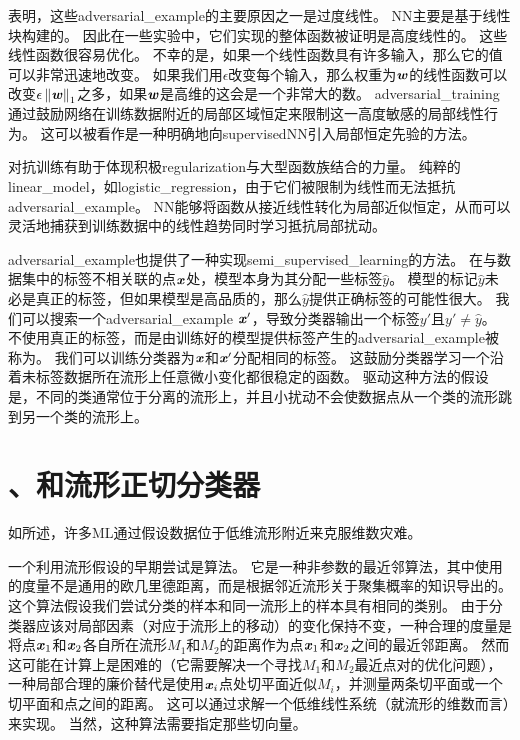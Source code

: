 \cite{Goodfellow-2015-adversarial}表明，这些\gls{adversarial_example}的主要原因之一是过度线性。
\gls{NN}主要是基于线性块构建的。
因此在一些实验中，它们实现的整体函数被证明是高度线性的。
这些线性函数很容易优化。
不幸的是，如果一个线性函数具有许多输入，那么它的值可以非常迅速地改变。
如果我们用$\epsilon$改变每个输入，那么权重为$\boldsymbol{\mathit{w}}$的线性函数可以改变$\epsilon \left\lVert\boldsymbol{\mathit{w}}\right\rVert_1$之多，如果$\boldsymbol{\mathit{w}}$是高维的这会是一个非常大的数。
\gls{adversarial_training}通过鼓励网络在训练数据附近的局部区域恒定来限制这一高度敏感的局部线性行为。
这可以被看作是一种明确地向\gls{supervised}\gls{NN}引入局部恒定先验的方法。

对抗训练有助于体现积极\gls{regularization}与大型函数族结合的力量。
纯粹的\gls{linear_model}，如\gls{logistic_regression}，由于它们被限制为线性而无法抵抗\gls{adversarial_example}。
\gls{NN}能够将函数从接近线性转化为局部近似恒定，从而可以灵活地捕获到训练数据中的线性趋势同时学习抵抗局部扰动。

\gls{adversarial_example}也提供了一种实现\gls{semi_supervised_learning}的方法。
在与数据集中的标签不相关联的点$\boldsymbol{\mathit{x}}$处，模型本身为其分配一些标签$\hat y$。
模型的标记$\hat y$未必是真正的标签，但如果模型是高品质的，那么$\hat y$提供正确标签的可能性很大。
我们可以搜索一个\gls{adversarial_example} $\boldsymbol{\mathit{x}}'$，导致分类器输出一个标签$y'$且$y' \neq \hat y$。
不使用真正的标签，而是由训练好的模型提供标签产生的\gls{adversarial_example}被称为\citep{miyato2015distributional}。
我们可以训练分类器为$\boldsymbol{\mathit{x}}$和$\boldsymbol{\mathit{x}}'$分配相同的标签。
这鼓励分类器学习一个沿着未标签数据所在流形上任意微小变化都很稳定的函数。
驱动这种方法的假设是，不同的类通常位于分离的流形上，并且小扰动不会使数据点从一个类的流形跳到另一个类的流形上。


\section{、和流形正切分类器}
\label{sec:tangent_distance_tangent_prop_and_manifold_tangent_classifier}
如所述，许多\gls{ML}通过假设数据位于低维流形附近来克服维数灾难。

一个利用流形假设的早期尝试是算法\citep{Simard93-small,Simard98}。
它是一种非参数的最近邻算法，其中使用的度量不是通用的欧几里德距离，而是根据邻近流形关于聚集概率的知识导出的。
这个算法假设我们尝试分类的样本和同一流形上的样本具有相同的类别。
由于分类器应该对局部因素（对应于流形上的移动）的变化保持不变，一种合理的度量是将点$\boldsymbol{\mathit{x}}_1$和$\boldsymbol{\mathit{x}}_2$各自所在流形$M_1$和$M_2$的距离作为点$\boldsymbol{\mathit{x}}_1$和$\boldsymbol{\mathit{x}}_2$之间的最近邻距离。
然而这可能在计算上是困难的（它需要解决一个寻找$M_1$和$M_2$最近点对的优化问题），一种局部合理的廉价替代是使用$\boldsymbol{\mathit{x}}_i$点处切平面近似$M_i$，并测量两条切平面或一个切平面和点之间的距离。
这可以通过求解一个低维线性系统（就流形的维数而言）来实现。
当然，这种算法需要指定那些切向量。

